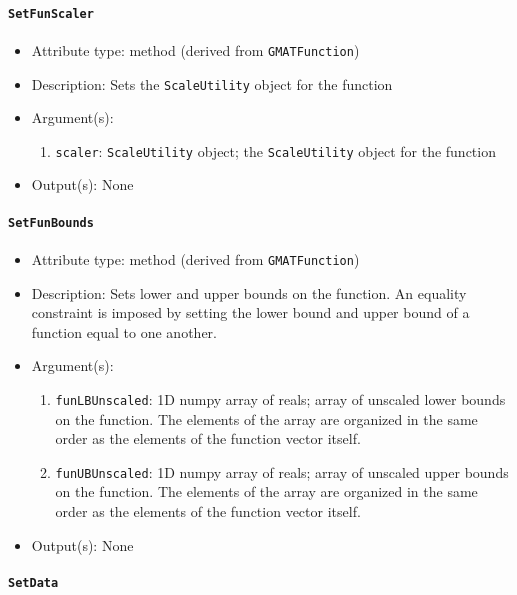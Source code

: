 \documentclass[]{article}
\begin{document}
\paragraph{\texttt{SetFunScaler}}

\begin{itemize}
	\item Attribute type: method (derived from \texttt{GMATFunction})
	\item Description: Sets the \texttt{ScaleUtility} object for the function
	\item Argument(s):
	\begin{enumerate}
		\item \texttt{scaler}: \texttt{ScaleUtility} object; the \texttt{ScaleUtility} object for the function
	\end{enumerate}
	\item Output(s): None
\end{itemize}

\paragraph{\texttt{SetFunBounds}}

\begin{itemize}
	\item Attribute type: method (derived from \texttt{GMATFunction})
	\item Description: Sets lower and upper bounds on the function. An equality constraint is imposed by setting the lower bound and upper bound of a function equal to one another.
	\item Argument(s):
	\begin{enumerate}
		\item \texttt{funLBUnscaled}: 1D numpy array of reals; array of unscaled lower bounds on the function. The elements of the array are organized in the same order as the elements of the function vector itself.
		\item \texttt{funUBUnscaled}: 1D numpy array of reals; array of unscaled upper bounds on the function. The elements of the array are organized in the same order as the elements of the function vector itself.
	\end{enumerate}
	\item Output(s): None
\end{itemize}

\paragraph{\texttt{SetData}}
\end{document}
